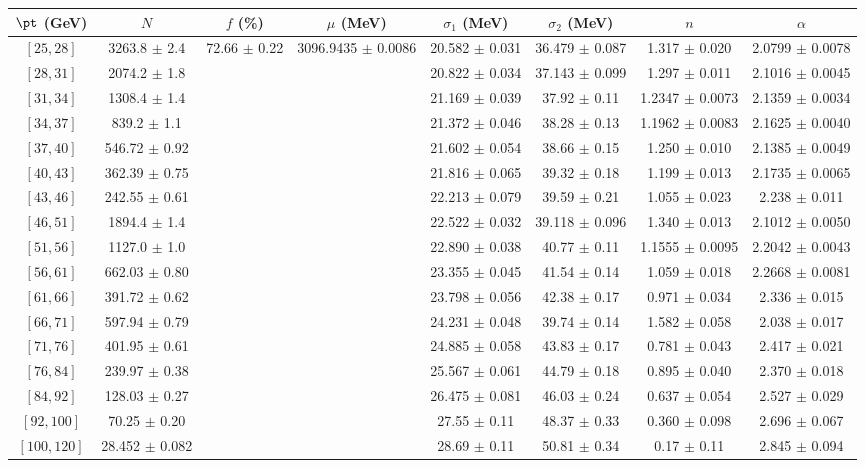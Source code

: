\begin{tabular}{c||c|c|c|c|c|c|c}
$\pt$ (GeV) & $N$ & $f$ (\%) & $\mu$ (MeV) & $\sigma_1$ (MeV) & $\sigma_2$ (MeV) & $n$ & $\alpha$ \\
\hline
$[25, 28]$ & 3263.8 $\pm$ 2.4 & \multirow{17}{*}{72.66 $\pm$ 0.22} & \multirow{17}{*}{3096.9435 $\pm$ 0.0086} & 20.582 $\pm$ 0.031 & 36.479 $\pm$ 0.087 & 1.317 $\pm$ 0.020 & 2.0799 $\pm$ 0.0078\\
$[28, 31]$ & 2074.2 $\pm$ 1.8 &  &  & 20.822 $\pm$ 0.034 & 37.143 $\pm$ 0.099 & 1.297 $\pm$ 0.011 & 2.1016 $\pm$ 0.0045\\
$[31, 34]$ & 1308.4 $\pm$ 1.4 &  &  & 21.169 $\pm$ 0.039 & 37.92 $\pm$ 0.11 & 1.2347 $\pm$ 0.0073 & 2.1359 $\pm$ 0.0034\\
$[34, 37]$ & 839.2 $\pm$ 1.1 &  &  & 21.372 $\pm$ 0.046 & 38.28 $\pm$ 0.13 & 1.1962 $\pm$ 0.0083 & 2.1625 $\pm$ 0.0040\\
$[37, 40]$ & 546.72 $\pm$ 0.92 &  &  & 21.602 $\pm$ 0.054 & 38.66 $\pm$ 0.15 & 1.250 $\pm$ 0.010 & 2.1385 $\pm$ 0.0049\\
$[40, 43]$ & 362.39 $\pm$ 0.75 &  &  & 21.816 $\pm$ 0.065 & 39.32 $\pm$ 0.18 & 1.199 $\pm$ 0.013 & 2.1735 $\pm$ 0.0065\\
$[43, 46]$ & 242.55 $\pm$ 0.61 &  &  & 22.213 $\pm$ 0.079 & 39.59 $\pm$ 0.21 & 1.055 $\pm$ 0.023 & 2.238 $\pm$ 0.011\\
$[46, 51]$ & 1894.4 $\pm$ 1.4 &  &  & 22.522 $\pm$ 0.032 & 39.118 $\pm$ 0.096 & 1.340 $\pm$ 0.013 & 2.1012 $\pm$ 0.0050\\
$[51, 56]$ & 1127.0 $\pm$ 1.0 &  &  & 22.890 $\pm$ 0.038 & 40.77 $\pm$ 0.11 & 1.1555 $\pm$ 0.0095 & 2.2042 $\pm$ 0.0043\\
$[56, 61]$ & 662.03 $\pm$ 0.80 &  &  & 23.355 $\pm$ 0.045 & 41.54 $\pm$ 0.14 & 1.059 $\pm$ 0.018 & 2.2668 $\pm$ 0.0081\\
$[61, 66]$ & 391.72 $\pm$ 0.62 &  &  & 23.798 $\pm$ 0.056 & 42.38 $\pm$ 0.17 & 0.971 $\pm$ 0.034 & 2.336 $\pm$ 0.015\\
$[66, 71]$ & 597.94 $\pm$ 0.79 &  &  & 24.231 $\pm$ 0.048 & 39.74 $\pm$ 0.14 & 1.582 $\pm$ 0.058 & 2.038 $\pm$ 0.017\\
$[71, 76]$ & 401.95 $\pm$ 0.61 &  &  & 24.885 $\pm$ 0.058 & 43.83 $\pm$ 0.17 & 0.781 $\pm$ 0.043 & 2.417 $\pm$ 0.021\\
$[76, 84]$ & 239.97 $\pm$ 0.38 &  &  & 25.567 $\pm$ 0.061 & 44.79 $\pm$ 0.18 & 0.895 $\pm$ 0.040 & 2.370 $\pm$ 0.018\\
$[84, 92]$ & 128.03 $\pm$ 0.27 &  &  & 26.475 $\pm$ 0.081 & 46.03 $\pm$ 0.24 & 0.637 $\pm$ 0.054 & 2.527 $\pm$ 0.029\\
$[92, 100]$ & 70.25 $\pm$ 0.20 &  &  & 27.55 $\pm$ 0.11 & 48.37 $\pm$ 0.33 & 0.360 $\pm$ 0.098 & 2.696 $\pm$ 0.067\\
$[100, 120]$ & 28.452 $\pm$ 0.082 &  &  & 28.69 $\pm$ 0.11 & 50.81 $\pm$ 0.34 & 0.17 $\pm$ 0.11 & 2.845 $\pm$ 0.094\\
\end{tabular}
